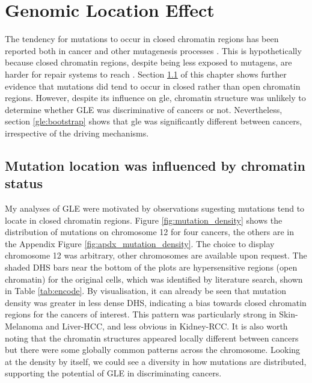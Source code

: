 \chapter{Genomic Location Effect}\label{gle}

The tendency for mutations to occur in closed \gls{chromatin} regions has been reported both in cancer and other mutagenesis processes \citep{Polak2015,Prendergast2007ChromatinGenome}. This is hypothetically because closed chromatin regions, despite being less exposed to mutagens, are harder for repair systems to reach \citep{Prendergast2007ChromatinGenome,Teng1997ExcisionSequences, Morse2002PhotoreactivationCerevisiae}. Section \ref{gle:chromatin} of this chapter shows further evidence that mutations did tend to occur in closed rather than open chromatin regions. However, despite its influence on \gls{gle}, chromatin structure was unlikely to determine whether GLE was discriminative of cancers or not. Nevertheless, section \ref{gle:bootstrap} shows that \gls{gle} was significantly different between cancers, irrespective of the driving mechanisms. 

\section{Mutation location was influenced by chromatin status}\label{gle:chromatin}
My analyses of GLE were motivated by observations sugesting mutations tend to locate in closed chromatin regions. Figure \ref{fig:mutation_density} shows the distribution of mutations on chromosome 12 for four cancers, the others are in the Appendix Figure \ref{fig:apdx_mutation_density}. The choice to display chromosome 12 was arbitrary, other chromosomes are available upon request. The shaded DHS bars near the bottom of the plots are hypersensitive regions (open chromatin) for the original cells, which was identified by literature search, shown in Table \ref{tab:encode}. By visualisation, it can already be seen that mutation density was greater in less dense DHS, indicating a bias towards closed chromatin regions for the cancers of interest. This pattern was particularly strong in Skin-Melanoma and Liver-HCC, and less obvious in Kidney-RCC. It is also worth noting that the chromatin structures appeared locally different between cancers but there were some globally common patterns across the chromosome. Looking at the density by itself, we could see a diversity in how mutations are distributed, supporting the potential of GLE in discriminating cancers. 


